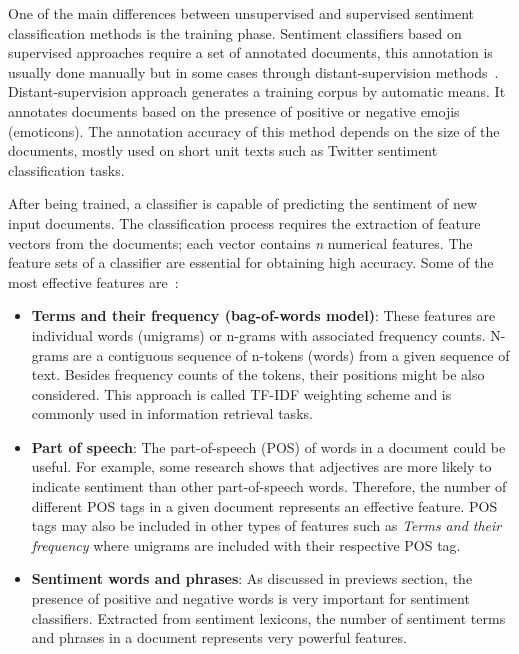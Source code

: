 {\pagebreak

One of the main differences between unsupervised and supervised sentiment classification methods is the training phase. Sentiment classifiers based on supervised approaches require a set of annotated documents, this annotation is usually done manually but in some cases through distant-supervision methods~\cite{go2009twitter}. Distant-supervision approach generates a training corpus by automatic means. It annotates documents based on the presence of positive or negative emojis (emoticons). The annotation accuracy of this method depends on the size of the documents, mostly used on short unit texts such as Twitter sentiment classification tasks. 

After being trained, a classifier is capable of predicting the sentiment of new input documents. The classification process requires the extraction of feature vectors from the documents; each vector contains \textit{n} numerical features. The feature sets of a classifier are essential for obtaining high accuracy. Some of the most effective features are~\cite[p. 25]{liu2012sentiment}: 

 \begin{itemize}
  \item \textbf{Terms and their frequency (bag-of-words model)}: These features are individual words (unigrams) or n-grams with associated frequency counts. N-grams are a contiguous sequence of n-tokens (words) from a given sequence of text. Besides frequency counts of the tokens, their positions might be also considered. This approach is called TF-IDF weighting scheme and is commonly used in information retrieval tasks.

    \item \textbf{Part of speech}: The part-of-speech (POS) of words in a document could be useful. For example, some research shows that adjectives are more likely to indicate sentiment than other part-of-speech words. Therefore, the number of different POS tags in a given document represents an effective feature. POS tags may also be included in other types of features such as \textit{Terms and their frequency} where unigrams are included with their respective POS tag.
    
    \item \textbf{Sentiment words and phrases}: As discussed in previews section, the presence of positive and negative words is very important for sentiment classifiers. Extracted from sentiment lexicons, the number of sentiment terms and phrases in a document represents very powerful features. 
    

\end{itemize}}

